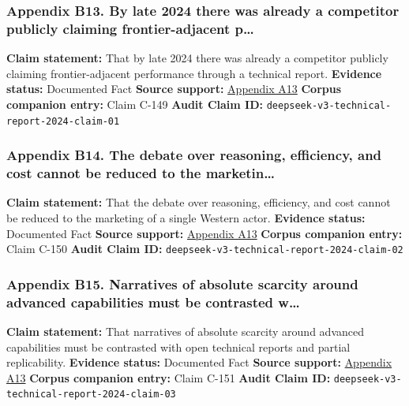 \documentclass[
  american,
  11pt,
  letterpaper,
]{article}
\begin{document}
\subsubsection{Appendix B13. By late 2024 there was already a competitor
publicly claiming frontier-adjacent
p\ldots{}}\label{ch-06-appendix-b13-by-late-2024-there-was-already-a-competitor-publicly-claiming-frontier-adjacent-p}

\textbf{Claim statement:} That by late 2024 there was already a
competitor publicly claiming frontier-adjacent performance through a
technical report. \textbf{Evidence status:} Documented Fact
\textbf{Source support:}
\hyperref[ch-06-appendix-a13-deepseek-v3-technical-report]{Appendix A13}
\textbf{Corpus companion entry:} Claim C-149 \textbf{Audit Claim ID:}
\texttt{deepseek-v3-technical-report-2024-claim-01}

\subsubsection{Appendix B14. The debate over reasoning, efficiency, and
cost cannot be reduced to the
marketin\ldots{}}\label{ch-06-appendix-b14-the-debate-over-reasoning-efficiency-and-cost-cannot-be-reduced-to-the-marketin}

\textbf{Claim statement:} That the debate over reasoning, efficiency,
and cost cannot be reduced to the marketing of a single Western actor.
\textbf{Evidence status:} Documented Fact \textbf{Source support:}
\hyperref[ch-06-appendix-a13-deepseek-v3-technical-report]{Appendix A13}
\textbf{Corpus companion entry:} Claim C-150 \textbf{Audit Claim ID:}
\texttt{deepseek-v3-technical-report-2024-claim-02}

\subsubsection{Appendix B15. Narratives of absolute scarcity around
advanced capabilities must be contrasted
w\ldots{}}\label{ch-06-appendix-b15-narratives-of-absolute-scarcity-around-advanced-capabilities-must-be-contrasted-w}

\textbf{Claim statement:} That narratives of absolute scarcity around
advanced capabilities must be contrasted with open technical reports and
partial replicability. \textbf{Evidence status:} Documented Fact
\textbf{Source support:}
\hyperref[ch-06-appendix-a13-deepseek-v3-technical-report]{Appendix A13}
\textbf{Corpus companion entry:} Claim C-151 \textbf{Audit Claim ID:}
\texttt{deepseek-v3-technical-report-2024-claim-03}
\end{document}
